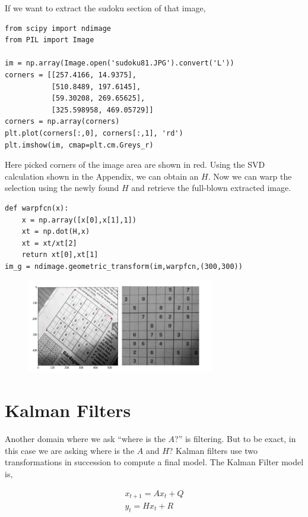 \documentclass{article}
\begin{document}
If we want to extract the sudoku section of that image,

\begin{verbatim}
from scipy import ndimage
from PIL import Image

im = np.array(Image.open('sudoku81.JPG').convert('L'))
corners = [[257.4166, 14.9375], 
           [510.8489, 197.6145], 
           [59.30208, 269.65625], 
           [325.598958, 469.05729]]
corners = np.array(corners)
plt.plot(corners[:,0], corners[:,1], 'rd')
plt.imshow(im, cmap=plt.cm.Greys_r)
\end{verbatim}

Here picked corners of the image area are shown in red. Using the SVD
calculation shown in the Appendix, we can obtain an $H$. Now we can warp the
selection using the newly found $H$ and retrieve the full-blown extracted image.

\begin{verbatim}
def warpfcn(x):
    x = np.array([x[0],x[1],1])
    xt = np.dot(H,x)
    xt = xt/xt[2]
    return xt[0],xt[1]
im_g = ndimage.geometric_transform(im,warpfcn,(300,300))
\end{verbatim}

\begin{figure}[h]
  \centering
  \includegraphics[width=22em]{out2.png}
\end{figure}

\section{Kalman Filters}

Another domain where we ask ``where is the $A$?'' is filtering. But to be exact,
in this case we are asking where is the $A$ and $H$? Kalman filters use two
transformations in succession to compute a final model. The Kalman Filter model
is,

\begin{eqnarray*}
x_{t+1} = A x_t + Q\\
y_t = Hx_t + R
\end{eqnarray*}
\end{document}
